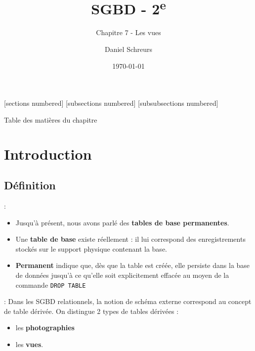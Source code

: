 \documentclass[10pt]{beamer}
\title{SGBD - 2\textsuperscript{e}}
\subtitle{Chapitre 7 - Les vues}
\date{\today}
\author{Daniel Schreurs}
\institute{Haute École de Province de Liège}
\begin{document}
\maketitle

[sections numbered]
[subsections numbered]
[subsubsections numbered]
\begin{frame}[allowframebreaks]{Table des matières du chapitre}
    \tableofcontents[subsectionstyle=show/show/hide,subsubsectionstyle=show/show/hide,]
\end{frame}

\section{Introduction}
\tocss
\subsection{Définition}
\begin{frame}{\secname : \subsecname}
    \begin{itemize}
        \item Jusqu'à présent, nous avons parlé des \textbf{tables de base permanentes}.
        \item Une \textbf{table de base} existe réellement : il lui correspond des enregistrements stockés sur le support physique contenant la base.
        \item \textbf{Permanent} indique que, dès que la table est créée, elle persiste dans la base de données jusqu'à ce qu'elle soit explicitement effacée au moyen de la commande \lstinline[language=plsql]!DROP TABLE!
    \end{itemize}
\end{frame}

\begin{frame}{\secname : \subsecname}
    Dans les SGBD relationnels, la notion de schéma externe correspond au concept de table dérivée.  On distingue 2 types de tables dérivées :
    \begin{itemize}
        \item les \textbf{photographies}
        \item les \textbf{vues}.
    \end{itemize}
\end{frame}
\end{document}
